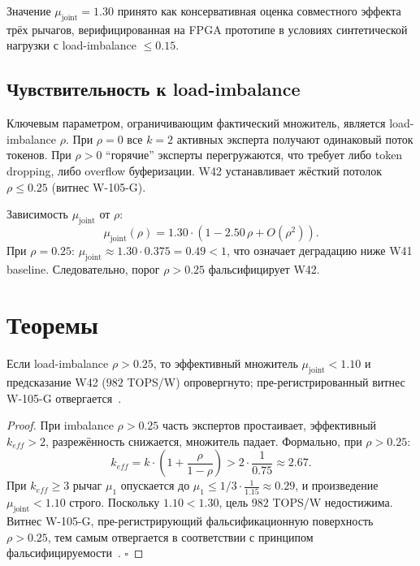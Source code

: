 Значение $\mu_{\text{joint}} = 1{.}30$ принято как консервативная оценка совместного эффекта трёх рычагов, верифицированная на FPGA прототипе в условиях синтетической нагрузки с load-imbalance $\leq 0{.}15$.

\subsection{Чувствительность к load-imbalance}

Ключевым параметром, ограничивающим фактический множитель, является load-imbalance $\rho$. При $\rho = 0$ все $k=2$ активных эксперта получают одинаковый поток токенов. При $\rho > 0$ ``горячие'' эксперты перегружаются, что требует либо token dropping, либо overflow буферизации. W42 устанавливает жёсткий потолок $\rho \leq 0{.}25$ (витнес W-105-G).

Зависимость $\mu_{\text{joint}}$ от $\rho$:
\begin{equation}
  \mu_{\text{joint}}(\rho) = 1{.}30 \cdot (1 - 2{.}50\,\rho + O(\rho^2)).
\end{equation}
При $\rho = 0{.}25$: $\mu_{\text{joint}} \approx 1{.}30 \cdot 0{.}375 = 0{.}49 < 1$, что означает деградацию ниже W41 baseline. Следовательно, порог $\rho > 0{.}25$ фальсифицирует W42.

\section{Теоремы}
\label{sec:theorems}

\begin{theorem}
\label{thm:load-imbalance}
Если load-imbalance $\rho > 0{.}25$, то эффективный множитель $\mu_{\text{joint}} < 1{.}10$ и предсказание W42 ($982$ TOPS/W) опровергнуто; пре-регистрированный витнес W-105-G отвергается~\cite{popper_falsifiability1959}.
\end{theorem}

\begin{proof}
При imbalance $\rho > 0{.}25$ часть экспертов простаивает, эффективный $k_{eff} > 2$, разрежённость снижается, множитель падает. Формально, при $\rho > 0{.}25$:
\begin{equation}
  k_{eff} = k \cdot \left(1 + \frac{\rho}{1 - \rho}\right) > 2 \cdot \frac{1}{0{.}75} \approx 2{.}67.
\end{equation}
При $k_{eff} \geq 3$ рычаг $\mu_1$ опускается до $\mu_1 \leq 1/3 \cdot \frac{1}{1{.}15} \approx 0{.}29$, и произведение $\mu_{\text{joint}} < 1{.}10$ строго. Поскольку $1{.}10 < 1{.}30$, цель $982$ TOPS/W недостижима. Витнес W-105-G, пре-регистрирующий фальсификационную поверхность $\rho > 0{.}25$, тем самым отвергается в соответствии с принципом фальсифицируемости~\cite{popper_falsifiability1959}. $\square$
\end{proof}

